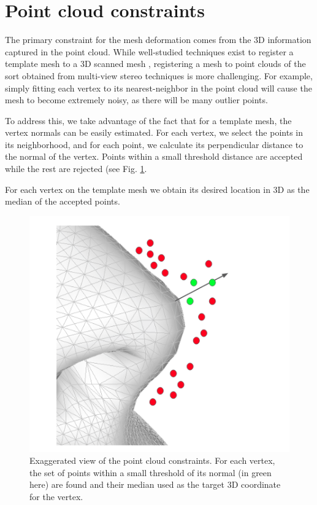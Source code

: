  
 \section{Point cloud constraints}
 The primary constraint for the mesh deformation comes from the 3D information captured in the point cloud.
 While well-studied techniques exist to register a template mesh to a 3D scanned mesh \cite{amberg2007optimal}, registering a mesh to point clouds of the sort obtained from multi-view stereo techniques is more challenging. For example, simply fitting each vertex to its nearest-neighbor in the point cloud will cause the mesh to become extremely noisy, as there will be many outlier points.
 
To address this, we take advantage of the fact that for a template mesh, the vertex normals can be easily estimated. For each vertex, we select the points in its neighborhood, and for each point, we calculate its perpendicular distance to the normal of the vertex. Points within a small threshold distance are accepted while the rest are rejected (see Fig. \ref{fig:mesh_fit_pcl}. 
 
 For each vertex on the template mesh we obtain its desired location in 3D as the median of the accepted points.
 
\begin{figure}[t]
\begin{center}
   \includegraphics[width=0.7\linewidth]{images/mesh_fit_pcl.png}
\end{center}
   \caption{Exaggerated view of the point cloud constraints. For each vertex, the set of points within a small threshold of its normal (in green here) are found and their median used as the target 3D coordinate for the vertex. }
\label{fig:mesh_fit_pcl}
\end{figure}

